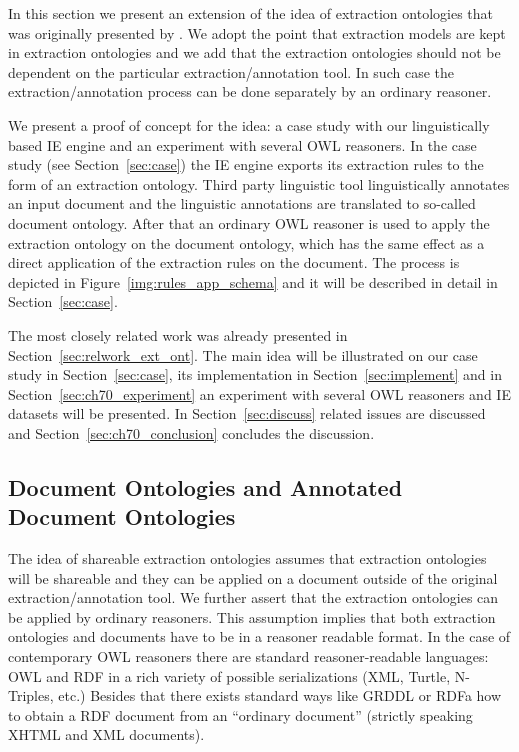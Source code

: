 In this section we present an extension of the idea of extraction ontologies that was originally presented by \cite{DBLP:conf/er/EmbleyTL02}. We adopt the point that extraction models are kept in extraction ontologies and we add that the extraction ontologies should not be dependent on the particular extraction/annotation tool. In such case the extraction/annotation process can be done separately by an ordinary reasoner.


We present a proof of concept for the idea: a case study with our linguistically based IE engine and an experiment with several OWL reasoners. In the case study (see Section~\ref{sec:case}) the IE engine exports its extraction rules to the form of an extraction ontology. Third party linguistic tool linguistically annotates an input document and the linguistic annotations are translated to so-called document ontology. After that an ordinary OWL reasoner is used to apply the extraction ontology on the document ontology, which has the same effect as a direct application of the extraction rules on the document. The process is depicted in Figure~\ref{img:rules_app_schema} and it will be described in detail in Section~\ref{sec:case}.



The most closely related work was already presented in Section~\ref{sec:relwork_ext_ont}. The main idea will be illustrated on our case study in Section~\ref{sec:case}, its implementation in Section~\ref{sec:implement} and in Section~\ref{sec:ch70_experiment} an experiment with several OWL reasoners and IE datasets will be presented. In Section~\ref{sec:discuss} related issues are discussed and Section~\ref{sec:ch70_conclusion} concludes the discussion.

\subsection{Document Ontologies and Annotated Document Ontologies} \label{sec:ch70_doc_ont}

The idea of shareable extraction ontologies assumes that extraction ontologies will be shareable and they can be applied on a document outside of the original extraction/annotation tool. We further assert that the extraction ontologies can be applied by ordinary reasoners. This assumption implies that both extraction ontologies and documents have to be in a reasoner readable format. In the case of contemporary OWL reasoners there are standard reasoner-readable languages: OWL and RDF in a rich variety of possible serializations (XML, Turtle, N-Triples, etc.) Besides that there exists standard ways like GRDDL or RDFa how to obtain a RDF document from an ``ordinary document'' (strictly speaking XHTML and XML documents).

